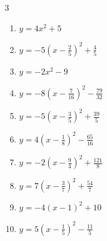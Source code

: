 \begin{multicols}{3}
\begin{enumerate}
  \item $\displaystyle y=4x^{2}+5$

        \phantom{$\displaystyle 頂点\left( 0 , 5 \right)$}

  \item $\displaystyle y=-5\left( x-\frac{2}{5}\right)^{2}+\frac{4}{5}$


  \item $\displaystyle y=-2x^{2}-9$

        \phantom{$\displaystyle 頂点\left( 0 , -9 \right)$}

  \item $\displaystyle y=-8\left( x-\frac{7}{16}\right)^{2}-\frac{79}{32}$


  \item $\displaystyle y=-5\left( x-\frac{3}{5}\right)^{2}+\frac{39}{5}$


  \item $\displaystyle y=4\left( x-\frac{1}{8}\right)^{2}-\frac{65}{16}$


  \item $\displaystyle y=-2\left( x-\frac{9}{4}\right)^{2}+\frac{121}{8}$


  \item $\displaystyle y=7\left( x-\frac{3}{7}\right)^{2}+\frac{54}{7}$


  \item $\displaystyle y=-4\left( x-1\right)^{2}+10$

        \phantom{$\displaystyle 頂点\left( 1 , 10 \right)$}

\columnbreak %

  \item $\displaystyle y=5\left( x-\frac{1}{5}\right)^{2}-\frac{11}{5}$



\end{enumerate}
\end{multicols}
